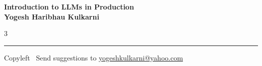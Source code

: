 \documentclass[8pt,landscape]{article}
\begin{document}
\footnotesize


\begin{center}
\Large{\textbf{Introduction to LLMs in Production\\ Yogesh Haribhau Kulkarni}}
\end{center}

\begin{multicols}{3}

\end{multicols}

\rule{\linewidth}{0.25pt}
\scriptsize
Copyleft \textcopyleft\  Send suggestions to
\href{http://www.yogeshkulkarni.com}{yogeshkulkarni@yahoo.com}
\end{document}
